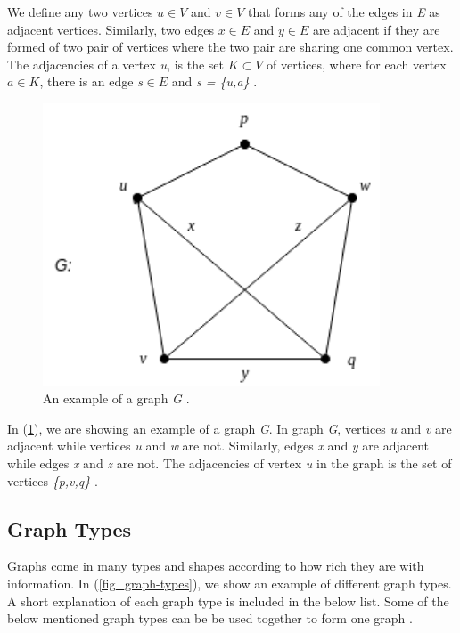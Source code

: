 {We define any two vertices $u \in V$ and $v \in V$ that forms any of the edges in \textit{E} as adjacent vertices. Similarly, two edges $x \in E$ and $y \in E$ are adjacent if they are formed of two pair of vertices where the two pair are sharing one common vertex. The adjacencies of a vertex \textit{u}, is the set $K \subset V$ of vertices, where for each vertex $a \in K$, there is an edge \mbox{$s \in E$} and \textit{s = \{u,a\}} \cite{harary6graph}.

\begin{figure}
\centering
\includegraphics[width=10cm]{pics/Graph.png}
\caption{An example of a graph \textit{G} \cite{harary6graph}.}
\label{fig_graph}
\end{figure} 

In (\ref{fig_graph}), we are showing an example of a graph \textit{G}. In graph \textit{G}, vertices \textit{u} and \textit{v} are adjacent while vertices \textit{u} and \textit{w} are not. Similarly, edges \textit{x} and \textit{y} are adjacent while edges \textit{x} and \textit{z} are not. The adjacencies of vertex \textit{u} in the graph is the set of vertices \textit{\{p,v,q\}} \cite{harary6graph}.




\subsection{Graph Types}
\label{subsec:GraphTypes}

Graphs come in many types and shapes according to how rich they are with information. In (\ref{fig_graph-types}), we show an example of different graph types. A short explanation of each graph type is included in the below list. Some of the below mentioned graph types can be be used together to form one graph \cite{DBLP:journals/corr/abs-1006-2361}.
\\
\\

}
